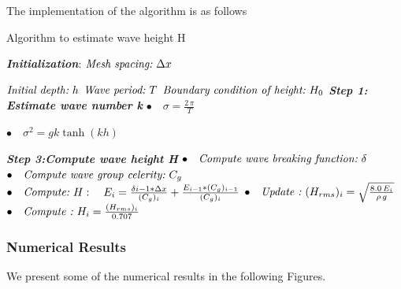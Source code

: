 The implementation of the algorithm is as follows
\begin{algorithm}[H]
\caption{Algorithm to estimate wave height H}\label{euclid}
\begin{algorithmic}[1]
\BState \emph{\textit{\textbf{Initialization}}}:
\State $\textit{Mesh spacing:\,\,} \Delta x$

\State $\textit{Initial depth:\,\,} h$
\State $\textit{Wave period:\,\,} T$
\State $\textit{Boundary condition of height:\,\,}H_{0}$
\BState \emph{\textbf{Step 1: Estimate wave number k}}
\State $\bullet \quad\sigma=\frac{2\, \pi}{T}$

\State $\bullet \quad\sigma^2=gk\tanh(kh)$

\BState \emph{\textbf{Step 3:Compute wave height H}}
\State $\bullet \quad\textit{Compute wave breaking function:\,\,} \delta$
\State $\bullet \quad\textit{Compute wave group celerity:\,\,} C_g$
\State $\bullet \quad\textit{Compute:\,\,} H:\quad E_{i}=\frac{\delta{i-1}*\Delta x}{(C_g)_{i}}+\frac{E_{i-1}*(C_g)_{i-1}}{(C_g)_{i}}$
\State $\bullet \quad\textit{Update :\,\,} (H_{rms})_{i}=\sqrt{\frac{8.0\,E_{i}}{\rho\, g}}$
\State $\bullet \quad\textit{Compute :\,\,} H_{i}=\frac{(H_{rms})_{i}}{0.707}$
\end{algorithmic}
\end{algorithm} 


\subsubsection{Numerical Results}
We present some of the numerical results in the following Figures.


